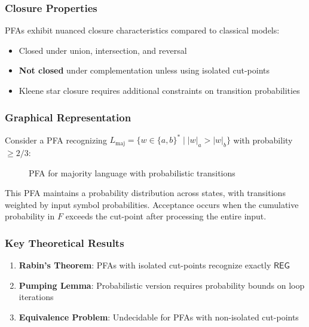 \subsubsection{Closure Properties}
PFAs exhibit nuanced closure characteristics compared to classical models:
\begin{itemize}
    \item Closed under union, intersection, and reversal \cite{paz1971introduction}
    \item \textbf{Not closed} under complementation unless using isolated cut-points \cite{bertoni1994closure}
    \item Kleene star closure requires additional constraints on transition probabilities \cite{hromkovic2000probabilistic}
\end{itemize}

\subsubsection{Graphical Representation}
Consider a PFA recognizing \( L_{\text{maj}} = \{ w \in \{a,b\}^* \mid |w|_a > |w|_b \} \) with probability \( \geq 2/3 \):

\begin{figure}[h]
    \centering  
    \caption{PFA for majority language with probabilistic transitions}
    \label{fig:pfa-example}
\end{figure}

This PFA maintains a probability distribution across states, with transitions weighted by input symbol probabilities. Acceptance occurs when the cumulative probability in \( F \) exceeds the cut-point after processing the entire input.

\subsubsection{Key Theoretical Results}
\begin{enumerate}
    \item \textbf{Rabin's Theorem}: PFAs with isolated cut-points recognize exactly \(\mathsf{REG}\) \cite{rabin1963probabilistic}
    \item \textbf{Pumping Lemma}: Probabilistic version requires probability bounds on loop iterations \cite{paz1971introduction}
    \item \textbf{Equivalence Problem}: Undecidable for PFAs with non-isolated cut-points \cite{tzelepis2021undecidable}
\end{enumerate}